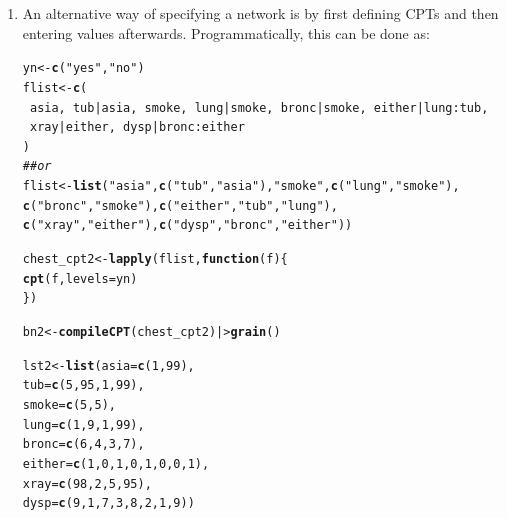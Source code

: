 \documentclass[10pt]{article}\usepackage[]{graphicx}\usepackage[]{xcolor}
\makeatletter
\newcommand{\hlnum}[1]{\textcolor[rgb]{0.686,0.059,0.569}{#1}}%
\newcommand{\hlstr}[1]{\textcolor[rgb]{0.192,0.494,0.8}{#1}}%
\newcommand{\hlcom}[1]{\textcolor[rgb]{0.678,0.584,0.686}{\textit{#1}}}%
\newcommand{\hlopt}[1]{\textcolor[rgb]{0,0,0}{#1}}%
\newcommand{\hlstd}[1]{\textcolor[rgb]{0.345,0.345,0.345}{#1}}%
\newcommand{\hlkwa}[1]{\textcolor[rgb]{0.161,0.373,0.58}{\textbf{#1}}}%
\newcommand{\hlkwb}[1]{\textcolor[rgb]{0.69,0.353,0.396}{#1}}%
\newcommand{\hlkwc}[1]{\textcolor[rgb]{0.333,0.667,0.333}{#1}}%
\newcommand{\hlkwd}[1]{\textcolor[rgb]{0.737,0.353,0.396}{\textbf{#1}}}%
\newenvironment{kframe}{%
 \def\at@end@of@kframe{}%
 \ifinner\ifhmode%
  \def\at@end@of@kframe{\end{minipage}}%
  \begin{minipage}{\columnwidth}%
 \fi\fi%
 \def\FrameCommand##1{\hskip\@totalleftmargin \hskip-\fboxsep
 \colorbox{shadecolor}{##1}\hskip-\fboxsep
     \hskip-\linewidth \hskip-\@totalleftmargin \hskip\columnwidth}%
 \MakeFramed {\advance\hsize-\width
   \@totalleftmargin\z@ \linewidth\hsize
   \@setminipage}}%
 {\par\unskip\endMakeFramed%
 \at@end@of@kframe}
\newenvironment{knitrout}{}{} %
\makeatother
\begin{document}
\begin{enumerate}
\item An alternative way of specifying a network is by first defining CPTs and then entering values afterwards. Programmatically, this can be done as:

\begin{knitrout}
\color{fgcolor}\begin{kframe}
\begin{alltt}
\hlstd{yn} \hlkwb{<-} \hlkwd{c}\hlstd{(}\hlstr{"yes"}\hlstd{,}\hlstr{"no"}\hlstd{)}
\hlstd{flist} \hlkwb{<-} \hlkwd{c}\hlstd{(}
    \hlopt{~}\hlstd{asia,} \hlopt{~}\hlstd{tub}\hlopt{|}\hlstd{asia,} \hlopt{~}\hlstd{smoke,} \hlopt{~}\hlstd{lung}\hlopt{|}\hlstd{smoke,} \hlopt{~}\hlstd{bronc}\hlopt{|}\hlstd{smoke,} \hlopt{~}\hlstd{either}\hlopt{|}\hlstd{lung}\hlopt{:}\hlstd{tub,}
    \hlopt{~}\hlstd{xray}\hlopt{|}\hlstd{either,} \hlopt{~}\hlstd{dysp}\hlopt{|}\hlstd{bronc}\hlopt{:}\hlstd{either}
\hlstd{)}
\hlcom{## or}
\hlstd{flist} \hlkwb{<-} \hlkwd{list}\hlstd{(}\hlstr{"asia"}\hlstd{,} \hlkwd{c}\hlstd{(}\hlstr{"tub"}\hlstd{,} \hlstr{"asia"}\hlstd{),} \hlstr{"smoke"}\hlstd{,} \hlkwd{c}\hlstd{(}\hlstr{"lung"}\hlstd{,} \hlstr{"smoke"}\hlstd{),}
              \hlkwd{c}\hlstd{(}\hlstr{"bronc"}\hlstd{,} \hlstr{"smoke"}\hlstd{),} \hlkwd{c}\hlstd{(}\hlstr{"either"}\hlstd{,} \hlstr{"tub"}\hlstd{,} \hlstr{"lung"}\hlstd{),}
              \hlkwd{c}\hlstd{(}\hlstr{"xray"}\hlstd{,} \hlstr{"either"}\hlstd{),} \hlkwd{c}\hlstd{(}\hlstr{"dysp"}\hlstd{,} \hlstr{"bronc"}\hlstd{,} \hlstr{"either"}\hlstd{))}

\hlstd{chest_cpt2} \hlkwb{<-} \hlkwd{lapply}\hlstd{(flist,} \hlkwa{function}\hlstd{(}\hlkwc{f}\hlstd{)\{}
    \hlkwd{cpt}\hlstd{(f,} \hlkwc{levels}\hlstd{=yn)}
\hlstd{\})}

\hlstd{bn2} \hlkwb{<-} \hlkwd{compileCPT}\hlstd{(chest_cpt2) |>} \hlkwd{grain}\hlstd{()}

\hlstd{lst2} \hlkwb{<-} \hlkwd{list}\hlstd{(}\hlkwc{asia}\hlstd{=}\hlkwd{c}\hlstd{(}\hlnum{1}\hlstd{,} \hlnum{99}\hlstd{),}
            \hlkwc{tub}\hlstd{=}\hlkwd{c}\hlstd{(}\hlnum{5}\hlstd{,} \hlnum{95}\hlstd{,} \hlnum{1}\hlstd{,} \hlnum{99}\hlstd{),}
            \hlkwc{smoke}\hlstd{=}\hlkwd{c}\hlstd{(}\hlnum{5}\hlstd{,} \hlnum{5}\hlstd{),}
            \hlkwc{lung}\hlstd{=}\hlkwd{c}\hlstd{(}\hlnum{1}\hlstd{,} \hlnum{9}\hlstd{,} \hlnum{1}\hlstd{,} \hlnum{99}\hlstd{),}
            \hlkwc{bronc}\hlstd{=}\hlkwd{c}\hlstd{(}\hlnum{6}\hlstd{,} \hlnum{4}\hlstd{,} \hlnum{3}\hlstd{,} \hlnum{7}\hlstd{),}
            \hlkwc{either}\hlstd{=}\hlkwd{c}\hlstd{(}\hlnum{1}\hlstd{,} \hlnum{0}\hlstd{,} \hlnum{1}\hlstd{,} \hlnum{0}\hlstd{,} \hlnum{1}\hlstd{,} \hlnum{0}\hlstd{,} \hlnum{0}\hlstd{,} \hlnum{1}\hlstd{),}
            \hlkwc{xray}\hlstd{=}\hlkwd{c}\hlstd{(}\hlnum{98}\hlstd{,} \hlnum{2}\hlstd{,} \hlnum{5}\hlstd{,} \hlnum{95}\hlstd{),}
            \hlkwc{dysp}\hlstd{=}\hlkwd{c}\hlstd{(}\hlnum{9}\hlstd{,} \hlnum{1}\hlstd{,} \hlnum{7}\hlstd{,} \hlnum{3}\hlstd{,} \hlnum{8}\hlstd{,} \hlnum{2}\hlstd{,} \hlnum{1}\hlstd{,} \hlnum{9}\hlstd{))}


\end{alltt}
\end{kframe}
\end{knitrout}
\end{enumerate}
\end{document}
